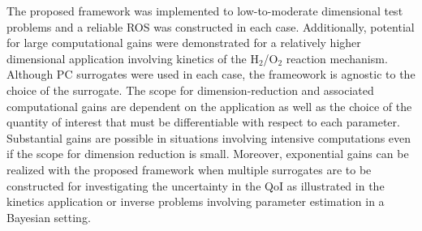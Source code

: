 The proposed framework was implemented to low-to-moderate dimensional test problems
and a reliable ROS was constructed in each case. Additionally, potential for large
computational gains were demonstrated for a relatively higher dimensional application
involving kinetics of the H$_2$/O$_2$ reaction mechanism. Although PC surrogates were
used in each case, the frameowork is agnostic to the choice of the surrogate. The scope
for dimension-reduction and associated computational gains are dependent on the
application as well as the choice of the quantity of interest that must be differentiable
with respect to each parameter. Substantial gains are possible in situations 
involving intensive computations even if the scope for dimension reduction is small. 
Moreover, exponential gains can be realized with the proposed framework when multiple
surrogates are to be constructed for investigating the uncertainty in the QoI as 
illustrated in the kinetics application or inverse problems involving parameter
estimation in a Bayesian setting.  

